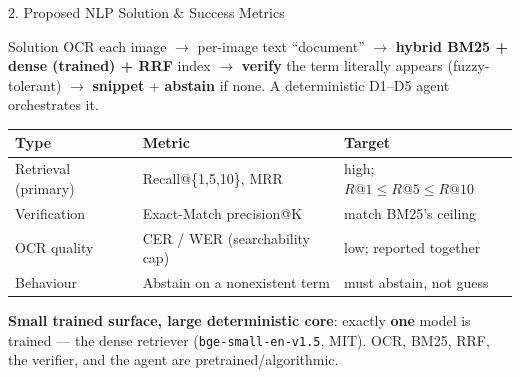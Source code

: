 \documentclass[10pt,aspectratio=169]{beamer}
\begin{document}
\begin{frame}{2. Proposed NLP Solution \& Success Metrics}
\begin{block}{Solution}
OCR each image $\rightarrow$ per-image text ``document'' $\rightarrow$ \textbf{hybrid BM25 + dense (trained) + RRF} index $\rightarrow$ \textbf{verify} the term literally appears (fuzzy-tolerant) $\rightarrow$ \textbf{snippet} + \textbf{abstain} if none. A deterministic D1--D5 agent orchestrates it.
\end{block}

\begin{table}[h]
\centering\small
\begin{tabular}{lll}
\toprule
\textbf{Type} & \textbf{Metric} & \textbf{Target} \\
\midrule
Retrieval (primary) & Recall@\{1,5,10\}, MRR & high; $R@1\le R@5\le R@10$ \\
Verification & Exact-Match precision@K & match BM25's ceiling \\
OCR quality & CER / WER (searchability cap) & low; reported together \\
Behaviour & Abstain on a nonexistent term & must abstain, not guess \\
\bottomrule
\end{tabular}
\end{table}

\textbf{Small trained surface, large deterministic core}: exactly \textbf{one} model is trained --- the dense retriever (\texttt{bge-small-en-v1.5}, MIT). OCR, BM25, RRF, the verifier, and the agent are pretrained/algorithmic.
\end{frame}
\end{document}
